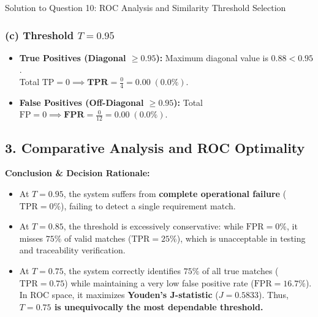 \documentclass[11pt,a4paper]{article}
\begin{document}
\begin{solutionbox}{Solution to Question 10: ROC Analysis and Similarity Threshold Selection}
\subsubsection*{(c) Threshold $T = 0.95$}
\begin{itemize}[leftmargin=1.5em,itemsep=1pt]
    \item \textbf{True Positives (Diagonal $\ge 0.95$):}
    Maximum diagonal value is $0.88 < 0.95$.\\
    Total $\text{TP} = 0 \implies \mathbf{TPR} = \frac{0}{4} = \mathbf{0.00} \; (0.0\%)$.
    \item \textbf{False Positives (Off-Diagonal $\ge 0.95$):}
    Total $\text{FP} = 0 \implies \mathbf{FPR} = \frac{0}{12} = \mathbf{0.00} \; (0.0\%)$.
\end{itemize}

\subsection*{3. Comparative Analysis and ROC Optimality}
\begin{center}
\label{tab:threshold_comparison}
\end{center}

\noindent
\textbf{Conclusion \& Decision Rationale:}
\begin{itemize}[leftmargin=1.5em,itemsep=2pt]
    \item At $T = 0.95$, the system suffers from \textbf{complete operational failure} ($\text{TPR} = 0\%$), failing to detect a single requirement match.
    \item At $T = 0.85$, the threshold is excessively conservative: while $\text{FPR} = 0\%$, it misses $75\%$ of valid matches ($\text{TPR} = 25\%$), which is unacceptable in testing and traceability verification.
    \item At $T = 0.75$, the system correctly identifies $75\%$ of all true matches ($\text{TPR} = 0.75$) while maintaining a very low false positive rate ($\text{FPR} = 16.7\%$). In ROC space, it maximizes \textbf{Youden's J-statistic} ($J = 0.5833$). Thus, \textbf{$T = 0.75$ is unequivocally the most dependable threshold.}
\end{itemize}
\end{solutionbox}
\end{document}
